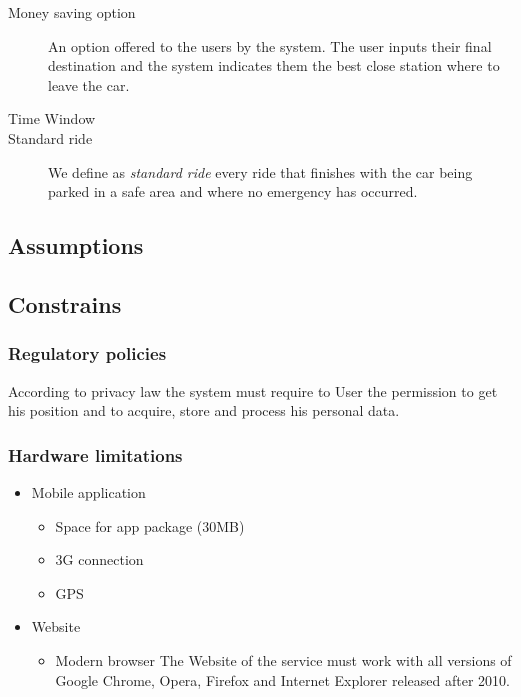 \documentclass{article}
\begin{document}
\begin{description}
				\item[Money saving option] An option offered to the users by the system. The user inputs their final destination and the system indicates them the best close station where to leave the car.
				
				\item[Time Window] %
				
				\item[Standard ride] We define as \textit{standard ride} every ride that finishes with the car being parked in a safe area and where no emergency has occurred.
			\end{description}

		\subsection{Assumptions}
		

		\subsection{Constrains}
			\subsubsection{Regulatory policies}
				According to privacy law the system must require to User the permission to get his position and to acquire, store and process his personal data.
			
			\subsubsection{Hardware limitations}
				\begin{itemize}
				\item Mobile application
				\begin{itemize}
				\item Space for app package (30MB)	
				\item 3G connection
				\item GPS
				\end{itemize}
				\item Website
				\begin{itemize}
					\item Modern browser
				The Website of the service must work with all versions of Google Chrome, Opera, Firefox and Internet Explorer released after 2010.	
				\end{itemize}
				\end{itemize}
\end{document}
